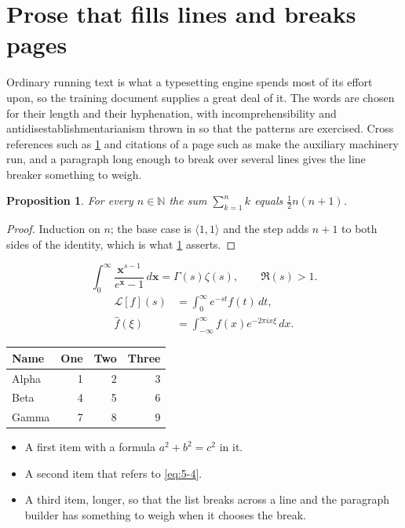 \documentclass[11pt,a4paper]{report}
\theoremstyle{plain}
\newtheorem{proposition}{Proposition}[chapter]
\newcommand{\vecn}[1]{\mathbf{#1}}
\newcommand{\pairs}[2]{\langle #1,#2\rangle}
\begin{document}
\section{Prose that fills lines and breaks pages}
\label{sec:prose5-4}
Ordinary running text is what a typesetting engine spends most of its effort
upon, so the training document supplies a great deal of it. The words are
chosen for their length and their hyphenation, with incomprehensibility and
antidisestablishmentarianism thrown in so that the patterns are exercised.
Cross references such as \cref{sec:prose5-4} and citations of a page such
as \pageref{sec:prose5-4} make the auxiliary machinery run, and a
paragraph long enough to break over several lines gives the line breaker
something to weigh.
\begin{proposition}\label{prop:5-4}
For every $n\in\mathbb{N}$ the sum $\sum_{k=1}^{n}k$ equals
$\tfrac{1}{2}n(n+1)$.
\end{proposition}
\begin{proof}
Induction on $n$; the base case is $\pairs{1}{1}$ and the step adds $n+1$ to
both sides of the identity, which is what \cref{prop:5-4} asserts.
\end{proof}
\begin{equation}\label{eq:5-4}
  \int_{0}^{\infty}\frac{\vecn{x}^{s-1}}{e^{\vecn{x}}-1}\,d\vecn{x}
    = \Gamma(s)\zeta(s),\qquad \Re(s)>1 .
\end{equation}
\begin{align}
  \mathcal{L}[f](s) &= \int_{0}^{\infty} e^{-st} f(t)\,dt, \\
  \widehat{f}(\xi)  &= \int_{-\infty}^{\infty} f(x) e^{-2\pi i x\xi}\,dx .
\end{align}
\par\noindent\begin{center}
\begin{tabular}{lrrr}
\hline
Name & One & Two & Three \\
\hline
Alpha & 1 & 2 & 3 \\
Beta & 4 & 5 & 6 \\
Gamma & 7 & 8 & 9 \\
\hline
\end{tabular}
\end{center}
\begin{itemize}
  \item A first item with a formula $a^2+b^2=c^2$ in it.
  \item A second item that refers to \eqref{eq:5-4}.
  \item A third item, longer, so that the list breaks across a line and the
    paragraph builder has something to weigh when it chooses the break.
\end{itemize}
\end{document}
